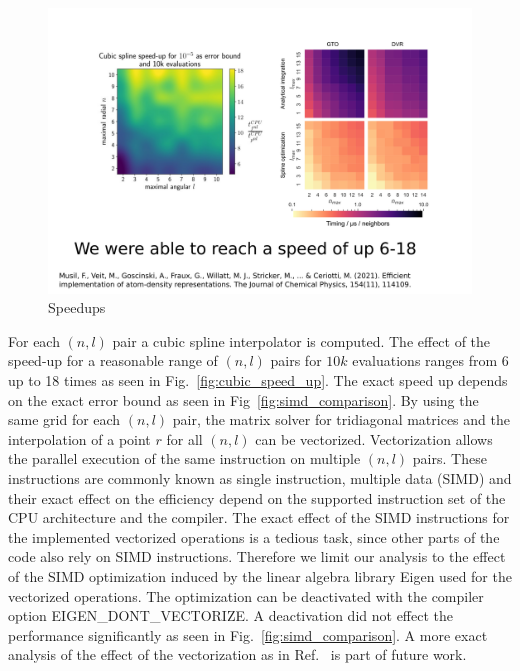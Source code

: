 \begin{figure}
    \includegraphics[width=\textwidth]{fig/slide20_3.png}
    \caption{Speedups}
    \label{fig:spline-speedups}
\end{figure}

For each $(n,l)$ pair a cubic spline interpolator is computed.
The effect of the speed-up for a reasonable range of $(n,l)$ pairs for $10k$ evaluations ranges from 6 up to 18 times as seen in Fig.~\ref{fig:cubic_speed_up}.
The exact speed up depends on the exact error bound as seen in Fig~\ref{fig:simd_comparison}.
By using the same grid for each $(n,l)$ pair, the matrix solver for tridiagonal matrices and the interpolation of a point $r$ for all $(n,l)$ can be vectorized.
Vectorization allows the parallel execution of the same instruction on multiple $(n,l)$ pairs.
These instructions are commonly known as single instruction, multiple data (SIMD) and their exact effect on the efficiency depend on the supported instruction set of the CPU architecture and the compiler.
The exact effect of the SIMD instructions for the implemented vectorized operations is a tedious task, since other parts of the code also rely on SIMD instructions\cite{mathuriya2017optimization}.
Therefore we limit our analysis to the effect of the SIMD optimization induced by the linear algebra library Eigen\cite{guennebaud2014eigen} used for the vectorized operations.
The optimization can be deactivated with the compiler option EIGEN\_DONT\_VECTORIZE.
A deactivation did not effect the performance significantly as seen in Fig.~\ref{fig:simd_comparison}.
A more exact analysis of the effect of the vectorization as in Ref.~\cite{mathuriya2017optimization} is part of future work.

